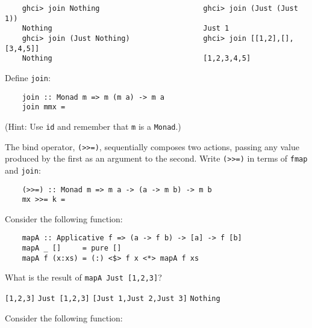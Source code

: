 \documentclass[a4paper,10pt,addpoints]{exam}
\begin{document}
\begin{questions}
  \begin{verbatim}
    ghci> join Nothing                        ghci> join (Just (Just 1))
    Nothing                                   Just 1
    ghci> join (Just Nothing)                 ghci> join [[1,2],[],[3,4,5]]
    Nothing                                   [1,2,3,4,5]
  \end{verbatim}

  Define \texttt{join}:

  \begin{verbatim}
    join :: Monad m => m (m a) -> m a
    join mmx =
  \end{verbatim}

  (Hint: Use \texttt{id} and remember that \texttt{m} is a
  \texttt{Monad}.)


  \question[1]

  The bind operator, \texttt{(>>=)}, sequentially composes two
  actions, passing any value produced by the first as an argument to
  the second. Write \texttt{(>>=)} in terms of \texttt{fmap} and
  \texttt{join}:

  \begin{verbatim}
    (>>=) :: Monad m => m a -> (a -> m b) -> m b
    mx >>= k =
  \end{verbatim}


  \newpage

  \question[1]

  Consider the following function:

  \begin{verbatim}
    mapA :: Applicative f => (a -> f b) -> [a] -> f [b]
    mapA _ []     = pure []
    mapA f (x:xs) = (:) <$> f x <*> mapA f xs
  \end{verbatim}

  What is the result of \texttt{mapA Just [1,2,3]}?

  \begin{choices}
    \choice \texttt{[1,2,3]}
    \choice \texttt{Just [1,2,3]}
    \choice \texttt{[Just 1,Just 2,Just 3]}
    \choice \texttt{Nothing}
  \end{choices}

  \vspace{0.15in}

  \question[2]

  Consider the following function:


\end{questions}
\end{document}
